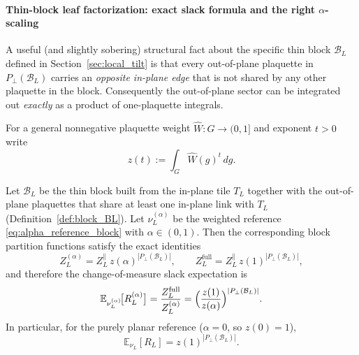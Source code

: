 \paragraph{Thin-block leaf factorization: exact slack formula and the right $\alpha$-scaling}

A useful (and slightly sobering) structural fact about the specific thin block $\mathcal B_L$ defined in
Section~\ref{sec:local_tilt} is that every out-of-plane plaquette in $P_\perp(\mathcal B_L)$ carries an
\emph{opposite in-plane edge} that is not shared by any other plaquette in the block.
Consequently the out-of-plane sector can be integrated out \emph{exactly} as a product of
one-plaquette integrals.

For a general nonnegative plaquette weight $\widehat W:G\to(0,1]$ and exponent $t>0$ write
\begin{equation}\label{eq:z_t_def}
z(t):=\int_G \widehat W(g)^{t}\,dg .
\end{equation}

\begin{lemma}\label{lem:leaf_factorization_thin_block}
Let $\mathcal B_L$ be the thin block built from the in-plane tile $T_L$ together with the out-of-plane plaquettes
that share at least one in-plane link with $T_L$ (Definition~\ref{def:block_BL}).
Let $\nu_L^{(\alpha)}$ be the weighted reference \eqref{eq:alpha_reference_block} with $\alpha\in(0,1)$.
Then the corresponding block partition functions satisfy the exact identities
\begin{equation}\label{eq:Zalpha_factorizes}
Z_L^{(\alpha)} = Z_L^{\parallel}\,z(\alpha)^{|P_\perp(\mathcal B_L)|},
\qquad
Z_L^{\mathrm{full}} = Z_L^{\parallel}\,z(1)^{|P_\perp(\mathcal B_L)|},
\end{equation}
and therefore the change-of-measure slack expectation is
\begin{equation}\label{eq:ER_alpha_exact_thin}
\mathbb E_{\nu_L^{(\alpha)}}\!\bigl[R_L^{(\alpha)}\bigr]
=\frac{Z_L^{\mathrm{full}}}{Z_L^{(\alpha)}}
=\Bigl(\frac{z(1)}{z(\alpha)}\Bigr)^{|P_\perp(\mathcal B_L)|}.
\end{equation}
In particular, for the purely planar reference ($\alpha=0$, so $z(0)=1$),
\begin{equation}\label{eq:ER_planar_exact_thin}
\mathbb E_{\nu_L}[R_L]=z(1)^{|P_\perp(\mathcal B_L)|}.
\end{equation}
\end{lemma}


